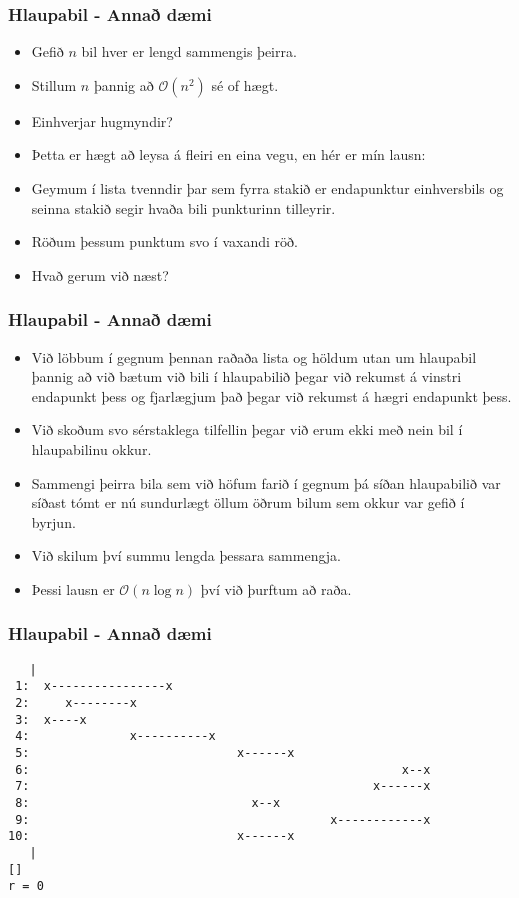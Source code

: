 \documentclass{beamer}
\begin{document}
\begin{frame}
	\frametitle{Hlaupabil - Annað dæmi}
	\begin{itemize}
			\item<1-> Gefið $n$ bil hver er lengd sammengis þeirra.
			\item<2-> Stillum $n$ þannig að $\mathcal{O}(n^2)$ sé of hægt.
			\item<3-> Einhverjar hugmyndir?
			\item<4-> Þetta er hægt að leysa á fleiri en eina vegu, en hér er mín lausn:
			\item<5-> Geymum í lista tvenndir þar sem fyrra stakið er endapunktur einhversbils
				og seinna stakið segir hvaða bili punkturinn tilleyrir.
			\item<6-> Röðum þessum punktum svo í vaxandi röð.
			\item<7-> Hvað gerum við næst?
		\end{itemize}
\end{frame}

\begin{frame}
	\frametitle{Hlaupabil - Annað dæmi}
	\begin{itemize}
			\item<1-> Við löbbum í gegnum þennan raðaða lista og höldum utan um hlaupabil þannig að
				við bætum við bili í hlaupabilið þegar við rekumst á vinstri endapunkt þess og fjarlægjum það 
				þegar við rekumst á hægri endapunkt þess. 
			\item<2-> Við skoðum svo sérstaklega tilfellin þegar við erum ekki með nein bil í hlaupabilinu okkur.
			\item<3-> Sammengi þeirra bila sem við höfum farið í gegnum þá síðan hlaupabilið var síðast tómt er nú
				sundurlægt öllum öðrum bilum sem okkur var gefið í byrjun.
			\item<4-> Við skilum því summu lengda þessara sammengja.
			\item<5-> Þessi lausn er $\mathcal{O}(n \log n)$ því við þurftum að raða.
		\end{itemize}
\end{frame}

\begin{frame}[fragile]
	\frametitle{Hlaupabil - Annað dæmi}
\begin{verbatim}
   |
 1:  x----------------x
 2:     x--------x
 3:  x----x
 4:              x----------x
 5:                             x------x
 6:                                                    x--x
 7:                                                x------x
 8:                               x--x
 9:                                          x------------x
10:                             x------x
   |
[]
r = 0
\end{verbatim}
\end{frame}
\addtocounter{framenumber}{-1}
\end{document}
